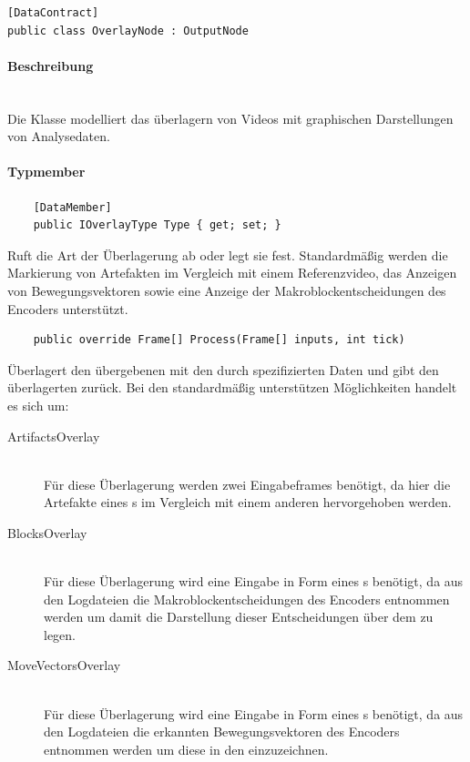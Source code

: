 \begin{verbatim}
[DataContract]
public class OverlayNode : OutputNode
\end{verbatim}

\paragraph{Beschreibung}~\\
Die Klasse  modelliert das überlagern von Videos mit graphischen Darstellungen von Analysedaten.

\paragraph{Typmember}
\begin{itemize}

	\begin{verbatim}
	[DataMember]
	public IOverlayType Type { get; set; }
	\end{verbatim}
	Ruft die Art der Überlagerung ab oder legt sie fest. Standardmäßig werden die Markierung von Artefakten im Vergleich mit einem Referenzvideo, das Anzeigen von Bewegungsvektoren sowie eine Anzeige der Makroblockentscheidungen des Encoders unterstützt.

	\begin{verbatim}
	public override Frame[] Process(Frame[] inputs, int tick)
	\end{verbatim}
	Überlagert den übergebenen  mit den durch  spezifizierten Daten und gibt den überlagerten  zurück. Bei den standardmäßig unterstützen Möglichkeiten handelt es sich um:
	\begin{description}
		\item[ArtifactsOverlay]~\\
			Für diese Überlagerung werden zwei Eingabeframes benötigt, da hier die Artefakte eines s im Vergleich mit einem anderen hervorgehoben werden.
		\item[BlocksOverlay]~\\
			Für diese Überlagerung wird eine Eingabe in Form eines s benötigt, da aus den Logdateien die Makroblockentscheidungen des Encoders entnommen werden um damit die Darstellung dieser Entscheidungen über dem  zu legen.
		\item[MoveVectorsOverlay]~\\
			Für diese Überlagerung wird eine Eingabe in Form eines s benötigt, da aus den Logdateien die erkannten Bewegungsvektoren des Encoders entnommen werden um diese in den  einzuzeichnen.
	\end{description}
	
\end{itemize}
